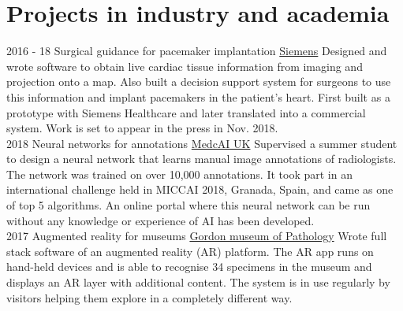 \documentclass[letterpaper]{twentysecondcv} %
\begin{document}
\section{Projects in industry and academia}
\begin{twenty}
	\twentyitem
    	{2016 - 18}
		{}
        {Surgical guidance for pacemaker implantation}
        {\href{https://www.healthcare.siemens.co.uk/about}{Siemens}}
        {}
        {
		Designed and wrote software to obtain live cardiac tissue information from imaging and projection onto a map. Also built a decision support system for surgeons to use this information and implant pacemakers in the patient's heart. First built as a prototype with Siemens Healthcare and later translated into a commercial system. Work is set to appear in the press in Nov. 2018.}
		\\
	\twentyitem
    	{2018}
		{}
        {Neural networks for annotations}
        {\href{http://www.medcai.co.uk}{MedcAI UK}}
        {
		Supervised a summer student to design a neural network that learns manual image annotations of radiologists. The network was trained on over 10,000 annotations. It took part in an international challenge held in MICCAI 2018, Granada, Spain, and came as one of top 5 algorithms. An online portal where this neural network can be run without any knowledge or experience of AI has been developed.}
		\\
	\twentyitem
    	{2017}
		{}
        {Augmented reality for museums}
        {\href{https://www.kcl.ac.uk/gordon/index.aspx}{Gordon museum of Pathology}}
        {
		Wrote full stack software of an augmented reality (AR) platform. The AR app runs on hand-held devices and is able to recognise 34 specimens in the museum and displays an AR layer with additional content. The system is in use regularly by visitors helping them explore in a completely different way. }
		\\ 


\end{twenty}
\end{document}
